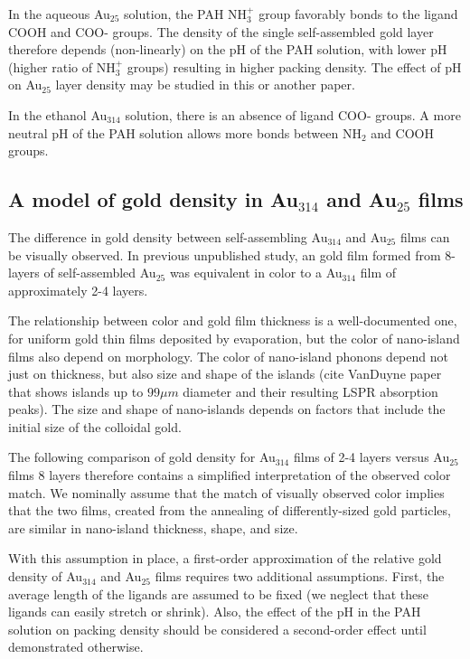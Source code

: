 \documentclass[12pt,oneside,english]{article}
\begin{document}
	In the aqueous Au$_{25}$ solution, the PAH NH$_3^+$ group favorably bonds to the ligand COOH and COO- groups.
	The density of the single self-assembled gold layer therefore depends (non-linearly) on the pH of the PAH solution, with lower pH (higher ratio of NH$_3^+$ groups) resulting in higher packing density.
	The effect of pH on Au$_{25}$ layer density may be studied in this or another paper.
	
	In the ethanol Au$_{314}$ solution, there is an absence of ligand COO- groups.
	A more neutral pH of the PAH solution allows more bonds between NH$_2$ and COOH groups.
	
	\subsection{A model of gold density in Au$_{314}$ and Au$_{25}$ films}
	The difference in gold density between self-assembling Au$_{314}$ and Au$_{25}$ films can be visually observed.
	In previous unpublished study, an gold film formed from 8-layers of self-assembled Au$_{25}$ was equivalent in color to a Au$_{314}$ film of approximately 2-4 layers.
	
	The relationship between color and gold film thickness is a well-documented one, for uniform gold thin films deposited by evaporation, but the color of nano-island films also depend on morphology.
	The color of nano-island phonons depend not just on thickness, but also size and shape of the islands \cite{link99} (cite VanDuyne paper that shows islands up to $99{\mu}m$ diameter and their resulting LSPR absorption peaks).
	The size and shape of nano-islands depends on factors that include the initial size of the colloidal gold.
	
	The following comparison of gold density for Au$_{314}$ films of 2-4 layers versus Au$_{25}$ films 8 layers therefore contains a simplified interpretation of the observed color match.  
	We nominally assume that the match of visually observed color implies that the two films, created from the annealing of differently-sized gold particles, are similar in nano-island thickness, shape, and size.
	
	With this assumption in place, a first-order approximation of the relative gold density of Au$_{314}$ and Au$_{25}$ films requires two additional assumptions.
	First, the average length of the ligands are assumed to be fixed (we neglect that these ligands can easily stretch or shrink).
	Also, the effect of the pH in the PAH solution on packing density should be considered a second-order effect until demonstrated otherwise.	
	
\end{document}
